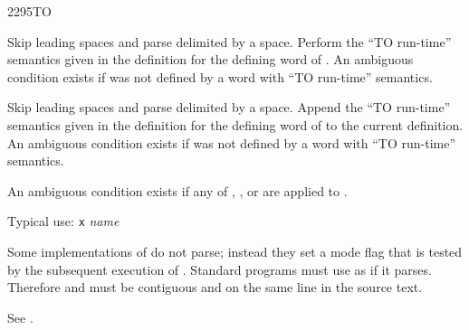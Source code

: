 %
%


%
%
%

\newpage
\begin{worddef}{2295}{TO}
\interpret

	Skip leading spaces and parse  delimited by a space.
	Perform the ``TO  run-time'' semantics given in the
	definition for the defining word of .
	An ambiguous condition exists if  was not defined
	by a word with ``TO  run-time'' semantics.

\compile

	Skip leading spaces and parse  delimited by a
	space. Append the ``TO  run-time'' semantics given
	in the definition for the defining word	of  to the
	current definition.
	An ambiguous condition exists if  was not defined
	by a word with ``TO  run-time'' semantics.

\note
	An ambiguous condition exists if any of	,
	\word{[COMPILE]},  or \word{[']} are applied to
	.


	\begin{rationale} %
		Typical use: \texttt{x}  \emph{name}

		Some implementations of  do not parse; instead they set
		a mode flag that is tested by the subsequent execution of
		.  Standard programs must use  as if it
		parses.  Therefore  and  must be
		contiguous and on the same line in the source text.
	\end{rationale}

	\begin{testing} %
		See .
	\end{testing}
\end{worddef}

